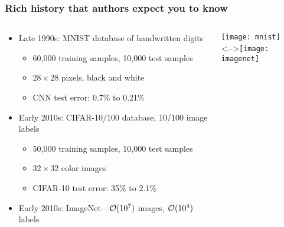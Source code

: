 \begin{frame}
    \frametitle{Rich history that authors expect you to know}
    \begin{columns}
        \begin{column}{0.55\textwidth}
            \begin{itemize}
                \item<+-> Late 1990s: MNIST database of handwritten digits
                \begin{itemize}
                    \item 60,000 training samples, 10,000 test samples
                    \item $28 \times 28$ pixels, black and white
                    \item CNN test error: 0.7\% \citep[``LeNet-5'',][]{LeCunIEEE98} to 0.21\% \citep{WanICML13}
                \end{itemize}
                \item<+-> Early 2010s: CIFAR-10/100 database, 10/100 image labels
                \begin{itemize}
                    \item 50,000 training samples, 10,000 test samples
                    \item $32 \times 32$ color images
                    \item CIFAR-10 test error: 35\% \citep{RanzatoAISTATS10} to 2.1\% \citep{Real18}
                \end{itemize}
                \item Early 2010s: ImageNet---$\mathcal{O}(10^7)$ images, $\mathcal{O}(10^4)$ labels
            \end{itemize}
        \end{column}
        \begin{column}{0.45\textwidth}
            \texttt{[image: mnist]} \\[5mm]
            \uncover<.->{\texttt{[image: imagenet]}}
        \end{column}
    \end{columns}
\end{frame}

